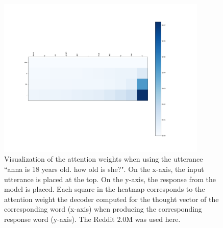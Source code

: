 \begin{figure}[H]
	\centering
	\includegraphics[width=10cm]{img/attention/attention_visualization3_reddit_2m.png}
	\caption{Visualization of the attention weights when using the utterance ``anna is 18 years old. how old is she?". On the x-axis, the input utterance is placed at the top. On the y-axis, the response from the model is placed. Each square in the heatmap corresponds to the attention weight the decoder computed for the thought vector of the corresponding word (x-axis) when producing the corresponding response word (y-axis). The Reddit 2.0M was used here.}
	\label{results:attention:example3:reddit}
\end{figure}